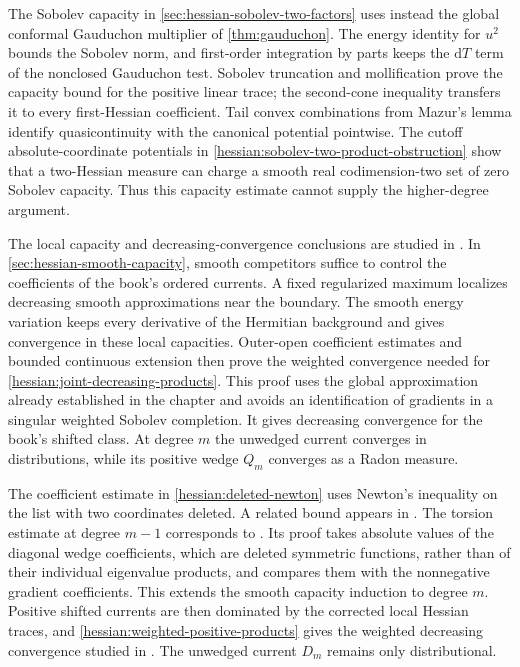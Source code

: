 The Sobolev capacity in \cref{sec:hessian-sobolev-two-factors} uses
instead the global conformal Gauduchon multiplier of
\cref{thm:gauduchon}. The energy identity for $u^2$ bounds the Sobolev
norm, and first-order integration by parts keeps the $\mathrm dT$
term of the nonclosed Gauduchon test. Sobolev truncation and
mollification prove the capacity bound for the positive linear trace;
the second-cone inequality transfers it to every first-Hessian
coefficient. Tail convex combinations from Mazur's lemma identify
quasicontinuity with the canonical potential pointwise. The cutoff
absolute-coordinate potentials in
\cref{hessian:sobolev-two-product-obstruction} show that a two-Hessian
measure can charge a smooth real codimension-two set of zero Sobolev
capacity. Thus this capacity estimate cannot supply the higher-degree
argument.

The local capacity and decreasing-convergence conclusions are studied
in \cite[Corollaries~3.18--3.19, p.~137, and Lemma~5.1,
pp.~143--145]{KNHermitianMeasures26}. In
\cref{sec:hessian-smooth-capacity}, smooth competitors suffice to
control the coefficients of the book's ordered currents. A fixed
regularized maximum localizes decreasing smooth approximations near
the boundary. The smooth energy variation keeps every derivative
of the Hermitian background and gives convergence in these local
capacities. Outer-open coefficient estimates and bounded continuous
extension then prove the weighted convergence needed for
\cref{hessian:joint-decreasing-products}. This proof uses the global
approximation already established in the chapter and avoids an
identification of gradients in a singular weighted Sobolev completion.
It gives decreasing convergence for the book's shifted class. At
degree $m$ the unwedged current converges in distributions, while
its positive wedge $Q_m$ converges as a Radon measure.

The coefficient estimate in \cref{hessian:deleted-newton} uses
Newton's inequality on the list with two coordinates deleted.
A related bound appears in \cite[equation~(2-8), p.~111]{KNHermitianMeasures26}.
The torsion estimate at degree $m-1$ corresponds to
\cite[Lemma~2.4 and Corollary~2.5, pp.~113--114]{KNHermitianMeasures26}.
Its proof takes absolute values of the diagonal wedge coefficients,
which are deleted symmetric functions, rather than of their individual
eigenvalue products, and compares them with the nonnegative gradient
coefficients.
This extends the smooth capacity induction to degree $m$.
Positive shifted currents are then dominated by the corrected local
Hessian traces, and \cref{hessian:weighted-positive-products} gives
the weighted decreasing convergence studied in
\cite[Lemma~5.1(b), pp.~144--145]{KNHermitianMeasures26}.
The unwedged current $D_m$ remains only distributional.

